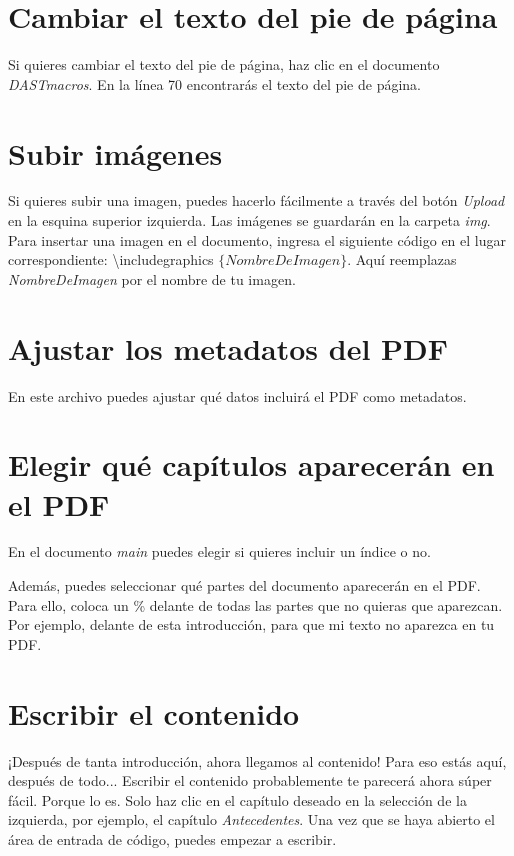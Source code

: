 \section{Cambiar el texto del pie de página}
Si quieres cambiar el texto del pie de página, haz clic en el documento \emph{DASTmacros}. En la línea 70 encontrarás el texto del pie de página.

\section{Subir imágenes}
Si quieres subir una imagen, puedes hacerlo fácilmente a través del botón \emph{Upload} en la esquina superior izquierda. Las imágenes se guardarán en la carpeta \textit{img}. Para insertar una imagen en el documento, ingresa el siguiente código en el lugar correspondiente: \textbackslash includegraphics $\{NombreDeImagen\}$. Aquí reemplazas \emph{NombreDeImagen} por el nombre de tu imagen.

\section{Ajustar los metadatos del PDF}
En este archivo puedes ajustar qué datos incluirá el PDF como metadatos.

\section{Elegir qué capítulos aparecerán en el PDF}
En el documento \emph{main} puedes elegir si quieres incluir un índice o no. \newline

Además, puedes seleccionar qué partes del documento aparecerán en el PDF. Para ello, coloca un \% delante de todas las partes que no quieras que aparezcan. Por ejemplo, delante de esta introducción, para que mi texto no aparezca en tu PDF.

\section{Escribir el contenido}
¡Después de tanta introducción, ahora llegamos al contenido! Para eso estás aquí, después de todo... Escribir el contenido probablemente te parecerá ahora súper fácil. Porque lo es. Solo haz clic en el capítulo deseado en la selección de la izquierda, por ejemplo, el capítulo \emph{Antecedentes}. Una vez que se haya abierto el área de entrada de código, puedes empezar a escribir.

